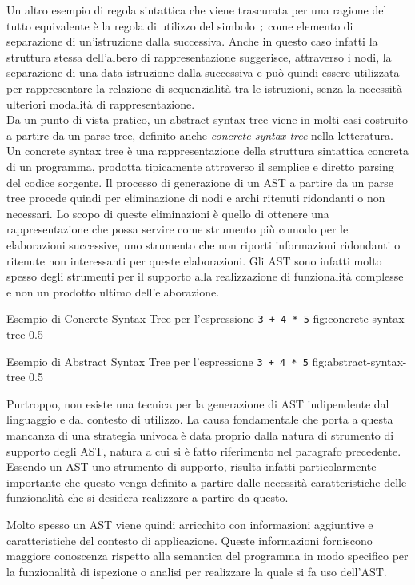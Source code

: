 Un altro esempio di regola sintattica che viene trascurata per una ragione del
tutto equivalente è la regola di utilizzo del simbolo \texttt{;} come elemento
di separazione di un’istruzione dalla successiva. Anche in questo caso infatti
la struttura stessa dell’albero di rappresentazione suggerisce, attraverso i
nodi, la separazione di una data istruzione dalla successiva e può quindi essere
utilizzata per rappresentare la relazione di sequenzialità tra le istruzioni,
senza la necessità ulteriori modalità di rappresentazione.\\

Da un punto di vista pratico, un abstract syntax tree viene in molti casi
costruito a partire da un parse tree, definito anche \textit{concrete syntax
tree} nella letteratura. Un concrete syntax tree è una rappresentazione della
struttura sintattica concreta di un programma, prodotta tipicamente attraverso
il semplice e diretto parsing del codice sorgente. Il processo di generazione di
un AST a partire da un parse tree procede quindi per eliminazione di nodi e
archi ritenuti ridondanti o non necessari. Lo scopo di queste eliminazioni è
quello di ottenere una rappresentazione che possa servire come strumento più
comodo per le elaborazioni successive, uno strumento che non riporti
informazioni ridondanti o ritenute non interessanti per queste elaborazioni. Gli
AST sono infatti molto spesso degli strumenti per il supporto alla realizzazione
di funzionalità complesse e non un prodotto ultimo dell’elaborazione.

      {Esempio di Concrete Syntax Tree per l'espressione \texttt{3 + 4 * 5}}
      {fig:concrete-syntax-tree}
      {0.5}

      {Esempio di Abstract Syntax Tree per l'espressione \texttt{3 + 4 * 5}}
      {fig:abstract-syntax-tree}
      {0.5}

Purtroppo, non esiste una tecnica per la generazione di AST indipendente dal
linguaggio e dal contesto di utilizzo. La causa fondamentale che porta a questa
mancanza di una strategia univoca è data proprio dalla natura di strumento di
supporto degli AST, natura a cui si è fatto riferimento nel paragrafo
precedente. Essendo un AST uno strumento di supporto, risulta infatti
particolarmente importante che questo venga definito a partire dalle necessità
caratteristiche delle funzionalità che si desidera realizzare a partire da
questo.

Molto spesso un AST viene quindi arricchito con informazioni aggiuntive e
caratteristiche del contesto di applicazione. Queste informazioni forniscono
maggiore conoscenza rispetto alla semantica del programma in modo specifico per
la funzionalità di ispezione o analisi per realizzare la quale si fa uso
dell’AST.

